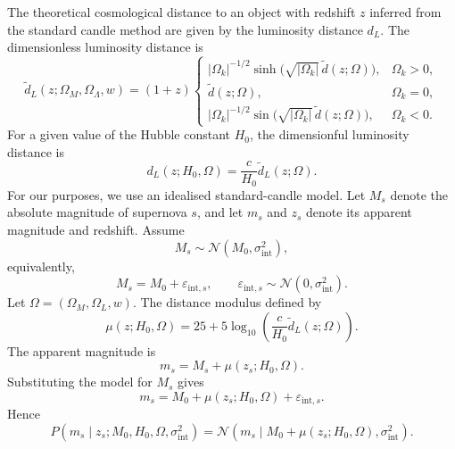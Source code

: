 \documentclass[11pt, titlepage]{article} %
\numberwithin{equation}{section}
\theoremstyle{definition}
\numberwithin{assumption}{section}
\begin{document}
The theoretical cosmological distance to an object with redshift $z$ inferred from the standard candle method are given by the luminosity distance $d_L$. The dimensionless luminosity distance is
\begin{equation*}
    \tilde d_L(z;\Omega_M,\Omega_\Lambda,w)
    =
    (1+z)
    \begin{cases}
        |\Omega_k|^{-1/2}\sinh\!\bigl(\sqrt{|\Omega_k|}\,\tilde d(z;\Omega)\bigr), & \Omega_k>0,\\
        \tilde d(z;\Omega), & \Omega_k=0,\\
        |\Omega_k|^{-1/2}\sin\!\bigl(\sqrt{|\Omega_k|}\,\tilde d(z;\Omega)\bigr), & \Omega_k<0.
    \end{cases}
\end{equation*}
For a given value of the Hubble constant $H_0$, the dimensionful luminosity distance is
\begin{equation*}
    d_L(z;H_0,\Omega)=\frac{c}{H_0}\tilde d_L(z;\Omega).
\end{equation*}
For our purposes, we use an idealised standard-candle model. Let $M_s$ denote the absolute magnitude of supernova $s$, and let $m_s$ and $z_s$ denote its apparent magnitude and redshift. Assume
\begin{equation*}
    M_s \sim \mathcal{N}(M_0,\sigma_{\mathrm{int}}^2),
\end{equation*}
equivalently,
\begin{equation*}
    M_s=M_0+\varepsilon_{\mathrm{int},s},
    \qquad
    \varepsilon_{\mathrm{int},s}\sim \mathcal{N}(0,\sigma_{\mathrm{int}}^2).
\end{equation*}
Let $\Omega=(\Omega_M,\Omega_L,w)$. The distance modulus defined by
\begin{equation*}
    \mu(z;H_0,\Omega)
    =
    25+5\log_{10}\!\left(\frac{c}{H_0}\tilde d_L(z;\Omega)\right).
\end{equation*}
The apparent magnitude is 
\begin{equation*}
    m_s=M_s+\mu(z_s;H_0,\Omega).
\end{equation*}
Substituting the model for $M_s$ gives
\begin{equation*}
    m_s=M_0+\mu(z_s;H_0,\Omega)+\varepsilon_{\mathrm{int},s}.
\end{equation*}
Hence
\begin{equation*}
    P(m_s\mid z_s;M_0,H_0,\Omega,\sigma_{\mathrm{int}}^2)
    =
    \mathcal{N}\!\left(
    m_s \mid M_0+\mu(z_s;H_0,\Omega),\sigma_{\mathrm{int}}^2
    \right).
\end{equation*}
\end{document}
